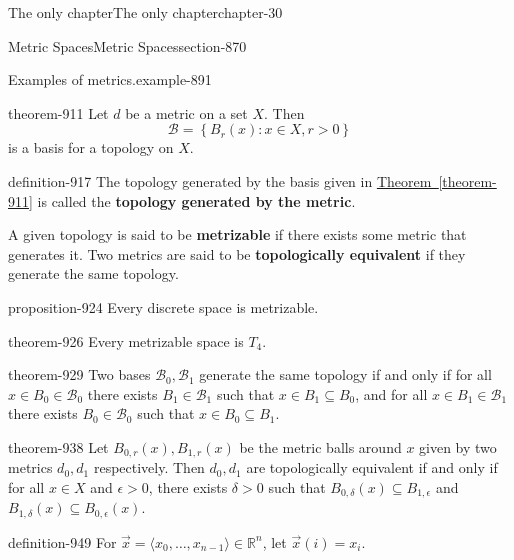 \documentclass[oneside,10pt,]{book}
\newcommand{\terminology}[1]{\textbf{#1}}
\newcommand{\tuple}[1]{\langle #1 \rangle}
\newcommand{\mb}{\mathbb}
\newcommand{\mc}{\mathcal}
\newcommand{\setBuilder}[2]{\left\{#1:#2\right\}}
\newcommand{\gt}{>}
\begin{document}
\begin{chapterptx}{The only chapter}{}{The only chapter}{}{}{chapter-30}
\begin{sectionptx}{Metric Spaces}{}{Metric Spaces}{}{}{section-870}
\begin{example}{Examples of metrics.}{example-891}
\begin{enumerate}
\end{enumerate}
\end{example}
\begin{theorem}{}{}{theorem-911}%
\hypertarget{p-912}{}%
Let \(d\) be a metric on a set \(X\). Then%
\begin{equation*}
\mc B=\setBuilder{B_r(x)}{x\in X,r>0}
\end{equation*}
is a basis for a topology on \(X\).%
\end{theorem}
\begin{definition}{}{definition-917}%
\hypertarget{p-918}{}%
The topology generated by the basis given in \hyperref[theorem-911]{Theorem~\ref{theorem-911}} is called the \terminology{topology generated by the metric}.%
\par
\hypertarget{p-921}{}%
A given topology is said to be \terminology{metrizable} if there exists some metric that generates it. Two metrics are said to be \terminology{topologically equivalent} if they generate the same topology.%
\end{definition}
\begin{proposition}{}{}{proposition-924}%
\hypertarget{p-925}{}%
Every discrete space is metrizable.%
\end{proposition}
\begin{theorem}{}{}{theorem-926}%
\hypertarget{p-927}{}%
Every metrizable space is \(T_4\).%
\end{theorem}
\begin{theorem}{}{}{theorem-929}%
\hypertarget{p-930}{}%
Two bases \(\mc B_0,\mc B_1\) generate the same topology if and only if for all \(x\in B_0\in\mc B_0\) there exists \(B_1\in\mc B_1\) such that \(x\in B_1\subseteq B_0\), and for all \(x\in B_1\in\mc B_1\) there exists \(B_0\in\mc B_0\) such that \(x\in B_0\subseteq B_1\). %
\end{theorem}
\begin{theorem}{}{}{theorem-938}%
\hypertarget{p-939}{}%
Let \(B_{0,r}(x),B_{1,r}(x)\) be the metric balls around \(x\) given by two metrics \(d_0,d_1\) respectively. Then \(d_0,d_1\) are topologically equivalent if and only if for all \(x\in X\) and \(\epsilon\gt 0\), there exists \(\delta\gt 0\) such that \(B_{0,\delta}(x)\subseteq B_{1,\epsilon}\) and \(B_{1,\delta}(x)\subseteq B_{0,\epsilon}(x)\).%
\end{theorem}
\begin{definition}{}{definition-949}%
\hypertarget{p-950}{}%
For \(\vec x=\tuple{x_0,\dots,x_{n-1}}\in\mb R^n\), let \(\vec x(i)=x_i\).%
\end{definition}

\end{sectionptx}
\end{chapterptx}
\end{document}
